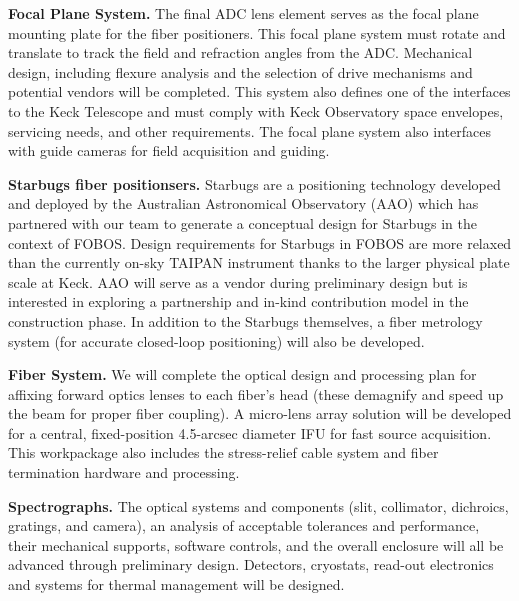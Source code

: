 \documentclass[oneside,11pt]{amsart}
\begin{document}
\noindent \textbf{Focal Plane System.} The final ADC lens element serves as the focal plane mounting plate for the fiber positioners.  This focal plane system must rotate and translate to track the field and refraction angles from the ADC.  Mechanical design, including flexure analysis and the selection of drive mechanisms and potential vendors will be completed.  This system also defines one of the interfaces to the Keck Telescope and must comply with Keck Observatory space envelopes, servicing needs, and other requirements.  The focal plane system also interfaces with guide cameras for field acquisition and guiding.

\noindent \textbf{Starbugs fiber positionsers.} Starbugs are a positioning technology developed and deployed by the
Australian Astronomical Observatory (AAO) which has partnered with our team to generate a conceptual design for
Starbugs in the context of FOBOS.  Design requirements for Starbugs in FOBOS are more relaxed than the currently on-sky
TAIPAN instrument thanks to the larger physical plate scale at Keck.  AAO will serve as a vendor during preliminary
design but is interested in exploring a partnership and in-kind contribution model in the construction phase.  In addition to the Starbugs themselves, a fiber metrology system (for accurate closed-loop positioning) will also be developed.

\noindent \textbf{Fiber System.} We will complete the optical design and processing plan for affixing forward optics
lenses to each fiber's head (these demagnify and speed up the beam for proper fiber coupling).  A micro-lens array
solution will be developed for a central, fixed-position 4.5-arcsec diameter IFU for fast source acquisition. This
workpackage also includes the stress-relief cable system and fiber termination hardware and processing.

\noindent \textbf{Spectrographs.} The optical systems and components (slit, collimator, dichroics, gratings, and camera), an analysis of acceptable tolerances and performance, their mechanical supports, software controls, and the overall enclosure will all be advanced through preliminary design.  Detectors, cryostats, read-out electronics and systems for thermal management will be designed.

\end{document}
